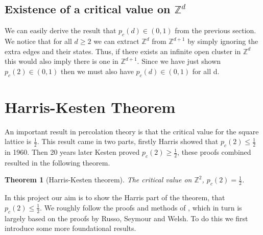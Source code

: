 \documentclass[a4paper,11pt]{article}
\newtheorem{theorem}{Theorem}[section]
\theoremstyle{definition}
\newcommand{\ints}{\mathbb{Z}}
\begin{document}
\subsection {Existence of a critical value on $\ints^d$}
We can easily derive the result that $p_c(d)\in (0,1)$ from the previous section. 
We notice that for all $d\geq 2$ we can extract $\ints^d$ from $\ints^{d+1}$ by simply ignoring the extra edges and their states.
Thus, if there exists an infinite open cluster in $\ints^d$ this would also imply there is one in $\ints^{d+1}$.
Since we have just shown $p_c(2) \in (0,1)$ then we must also have $p_c(d) \in (0,1)$ for all d.

{\color{red}{TODO: explain critical value is non-decreasing in d, by coupling argument?}}


\section{Harris-Kesten Theorem}
An important result in percolation theory is that the critical value for the square lattice is $\frac{1}{2}$. 
This result came in two parts, firstly Harris \cite{harris_1960} showed that $p_c(2) \leq \frac{1}{2}$ in 1960.
Then 20 years later Kesten \cite{kesten1980critical} proved $p_c(2) \geq \frac{1}{2}$, these proofs combined resulted in the following theorem.

\begin{theorem}[Harris-Kesten theorem]
	The critical value on $\ints^2$,  $p_c(2) =  \frac{1}{2}$.
\end{theorem}
In this project our aim is to show the Harris part of the theorem, that $p_c(2) \leq \frac{1}{2}$. We roughly follow the proofs and methods of \cite{bollobas2006short}, which in turn is largely based on the proofs by Russo, Seymour and Welsh.
To do this we first introduce some more foundational results.
\end{document}

